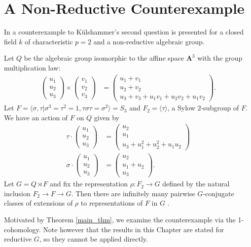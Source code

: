 \section{A Non-Reductive Counterexample}
In \cite{slodowy1997two} a counterexample to K\"ulshammer's second question is presented for a closed field $k$ of characteristic $p = 2$ and a non-reductive algebraic group.
\begin{example} Let $Q$ be the algebraic group isomorphic to the affine space $\mathbf{A}^3$ with the group multiplication law:
\begin{align*}
	\left(\begin{matrix} u_1 \\ u_2 \\ u_3 \end{matrix}\right) \times
	\left(\begin{matrix} v_1 \\ v_2 \\ v_3 \end{matrix}\right) &=
	\left(\begin{matrix} u_1 + v_1 \\ u_2 + v_2 \\ u_3 + v_3 + u_1v_1 + u_2v_2 + u_1v_2 \end{matrix}\right).
\end{align*}
Let $F = \langle \sigma, \tau | \sigma^3 = \tau^2 = 1, \tau\sigma\tau = \sigma^2 \rangle = S_3$ and $F_2 = \langle \tau \rangle$, a Sylow 2-subgroup of $F$. We have an action of $F$ on $Q$ given by
\begin{align*}
	\tau \cdot \left(\begin{matrix} u_1 \\ u_2 \\ u_3 \end{matrix} \right) &=
	\left(\begin{matrix} u_2 \\ u_1 \\ u_3 + u_1^2 + u_2^2 + u_1u_2 \end{matrix} \right) \\
	\sigma \cdot \left(\begin{matrix} u_1 \\ u_2 \\ u_3 \end{matrix} \right) &=
	\left(\begin{matrix} u_2 \\ u_1 + u_2 \\ u_3 \end{matrix} \right).
\end{align*}
Let $G = Q \rtimes F$ and fix the representation $\rho:F_2 \rightarrow G$ defined by the natural inclusion $F_2 \rightarrow F \rightarrow G$. Then there are infinitely many pairwise $G$-conjugate classes of extensions of $\rho$ to representations of $F$ in $G$ \cite[Appendix]{slodowy1997two}.
\label{eg:non_red}
\end{example}
Motivated by Theorem \ref{main_thm}, we examine the counterexample via the 1-cohomology. Note however that the results in this Chapter are stated for reductive $G$, so they cannot be applied directly.

